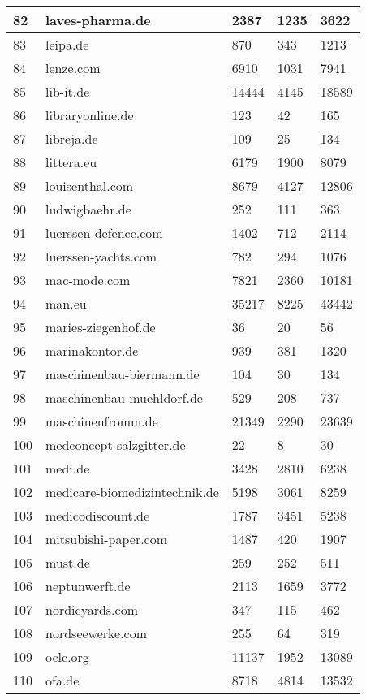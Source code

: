\begin{longtable}{|m{0.5cm}|m{6cm}|m{2cm}|m{2cm}|m{2cm}|}
	\hline
	82 & laves-pharma.de & 2387 & 1235 & 3622\\
	\hline
	83 & leipa.de & 870 & 343 & 1213\\
	\hline
	84 & lenze.com & 6910 & 1031 & 7941\\
	\hline
	85 & lib-it.de & 14444 & 4145 & 18589\\
	\hline
	86 & libraryonline.de & 123 & 42 & 165\\
	\hline
	87 & libreja.de & 109 & 25 & 134\\
	\hline
	88 & littera.eu & 6179 & 1900 & 8079\\
	\hline
	89 & louisenthal.com & 8679 & 4127 & 12806\\
	\hline
	90 & ludwigbaehr.de & 252 & 111 & 363\\
	\hline
	91 & luerssen-defence.com & 1402 & 712 & 2114\\
	\hline
	92 & luerssen-yachts.com & 782 & 294 & 1076\\
	\hline
	93 & mac-mode.com & 7821 & 2360 & 10181\\
	\hline
	94 & man.eu & 35217 & 8225 & 43442\\
	\hline
	95 & maries-ziegenhof.de & 36 & 20 & 56\\
	\hline
	96 & marinakontor.de & 939 & 381 & 1320\\
	\hline
	97 & maschinenbau-biermann.de & 104 & 30 & 134\\
	\hline
	98 & maschinenbau-muehldorf.de & 529 & 208 & 737\\
	\hline
	99 & maschinenfromm.de & 21349 & 2290 & 23639\\
	\hline
	100 & medconcept-salzgitter.de & 22 & 8 & 30\\
	\hline
	101 & medi.de & 3428 & 2810 & 6238\\
	\hline
	102 & medicare-biomedizintechnik.de & 5198 & 3061 & 8259\\
	\hline
	103 & medicodiscount.de & 1787 & 3451 & 5238\\
	\hline
	104 & mitsubishi-paper.com & 1487 & 420 & 1907\\
	\hline
	105 & must.de & 259 & 252 & 511\\
	\hline
	106 & neptunwerft.de & 2113 & 1659 & 3772\\
	\hline
	107 & nordicyards.com & 347 & 115 & 462\\
	\hline
	108 & nordseewerke.com & 255 & 64 & 319\\
	\hline
	109 & oclc.org & 11137 & 1952 & 13089\\
	\hline
	110 & ofa.de & 8718 & 4814 & 13532\\

\end{longtable}
